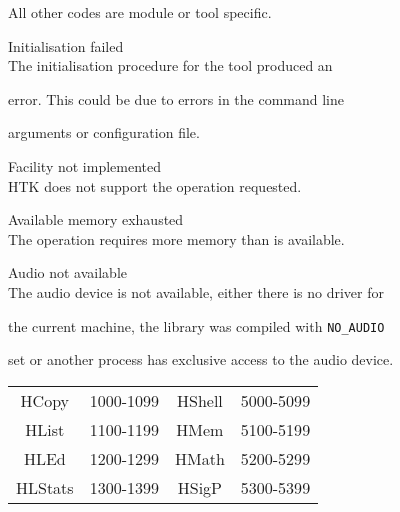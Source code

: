 All other codes are module or tool specific.










\begin{itemize}


 Initialisation failed \\


        The initialisation procedure for the tool produced an


        error. This could be due to errors in the command line


        arguments or configuration file.


 Facility not implemented \\


        HTK does not support the operation requested.





 Available memory exhausted \\


        The operation requires more memory than is available.


 Audio not available \\


        The audio device is not available, either there is no driver for


        the current machine, the library was compiled with \texttt{NO\_AUDIO}


        set or another process has exclusive access to the audio device.





\begin{center}


\begin{tabular}{|c|c|c|c|}


\hline


HCopy    & 1000-1099     & HShell        & 5000-5099    \\


HList    & 1100-1199     & HMem          & 5100-5199    \\


HLEd     & 1200-1299     & HMath         & 5200-5299    \\


HLStats  & 1300-1399     & HSigP         & 5300-5399    \\



\end{tabular}
\end{center}
\end{itemize}
